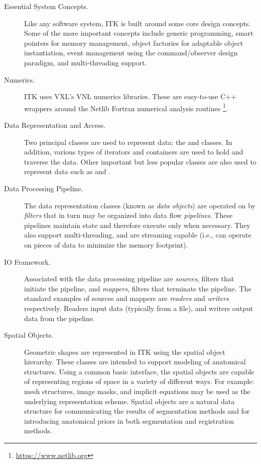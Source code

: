 \begin{description}
  \item[Essential System Concepts.] Like any software system, ITK is
        built around some core design concepts. Some of the more important
        concepts include generic programming, smart pointers for memory
        management, object factories for adaptable object instantiation,
        event management using the command/observer design paradigm, and
        multi-threading support.

  \item[Numerics.] ITK uses VXL's VNL numerics libraries. These are
        easy-to-use C++ wrappers around the Netlib Fortran numerical
        analysis routines \footnote{\url{https://www.netlib.org}}.

  \item[Data Representation and Access.] Two principal classes are
        used to represent data: the  and 
        classes. In addition, various types of iterators and containers are
        used to hold and traverse the data. Other important but less popular
        classes are also used to represent data such as  and
        .

  \item[Data Processing Pipeline.] The data representation
    classes (known as \emph{data objects}) are operated on by
    \emph{filters} that in turn may be organized into data flow
    \emph{pipelines}. These pipelines maintain state and therefore
    execute only when necessary.  They also support
    multi-threading, and are streaming capable (i.e., can operate
    on pieces of data to minimize the memory footprint).

    \item[IO Framework.] Associated with the data processing
        pipeline are \emph{sources}, filters that initiate the
        pipeline, and \emph{mappers}, filters that terminate the
        pipeline.  The standard examples of sources and mappers are
        \emph{readers} and \emph{writers} respectively. Readers
        input data (typically from a file), and writers output data
        from the pipeline.

  \item[Spatial Objects.] Geometric shapes are represented in ITK using
        the spatial object hierarchy. These classes are intended to support
        modeling of anatomical structures. Using a common basic interface,
        the spatial objects are capable of representing regions of space in a
        variety of different ways. For example: mesh structures, image masks,
        and implicit equations may be used as the underlying representation
        scheme. Spatial objects are a natural data structure for
        communicating the results of segmentation methods and for introducing
        anatomical priors in both segmentation and registration methods.


\end{description}
